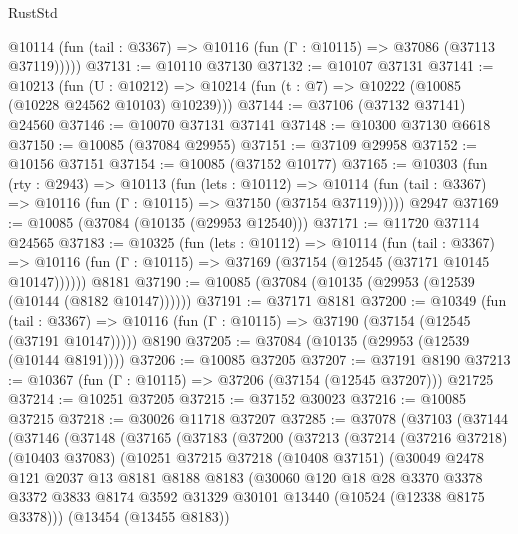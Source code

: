 \begin{lexlean}{RustStd}
\begin{coremodule}
      @10114 (fun (tail : @3367) => @10116 (fun (Γ : @10115) => @37086 (@37113 @37119)))))
@37131 := @10110 @37130
@37132 := @10107 @37131
@37141 := @10213
    (fun (U : @10212) => @10214 (fun (t : @7) => @10222 (@10085 (@10228 @24562 @10103) @10239)))
@37144 := @37106 (@37132 @37141) @24560
@37146 := @10070 @37131 @37141
@37148 := @10300 @37130 @6618
@37150 := @10085 (@37084 @29955)
@37151 := @37109 @29958
@37152 := @10156 @37151
@37154 := @10085 (@37152 @10177)
@37165 := @10303
    (fun (rty : @2943) =>
    @10113
      (fun (lets : @10112) =>
      @10114 (fun (tail : @3367) => @10116 (fun (Γ : @10115) => @37150 (@37154 @37119)))))
    @2947
@37169 := @10085 (@37084 (@10135 (@29953 @12540)))
@37171 := @11720 @37114 @24565
@37183 := @10325
    (fun (lets : @10112) =>
    @10114
      (fun (tail : @3367) =>
      @10116 (fun (Γ : @10115) => @37169 (@37154 (@12545 (@37171 @10145 @10147))))))
    @8181
@37190 := @10085 (@37084 (@10135 (@29953 (@12539 (@10144 (@8182 @10147))))))
@37191 := @37171 @8181
@37200 := @10349
    (fun (tail : @3367) => @10116 (fun (Γ : @10115) => @37190 (@37154 (@12545 (@37191 @10147)))))
    @8190
@37205 := @37084 (@10135 (@29953 (@12539 (@10144 @8191))))
@37206 := @10085 @37205
@37207 := @37191 @8190
@37213 := @10367 (fun (Γ : @10115) => @37206 (@37154 (@12545 @37207))) @21725
@37214 := @10251 @37205
@37215 := @37152 @30023
@37216 := @10085 @37215
@37218 := @30026 @11718 @37207
@37285 := @37078
    (@37103
      (@37144
        (@37146
          (@37148
            (@37165
              (@37183
                (@37200
                  (@37213
                    (@37214
                      (@37216 @37218)
                      (@10403 @37083)
                      (@10251
                        @37215
                        @37218
                        (@10408 @37151)
                        (@30049
                          @2478
                          @121
                          @2037
                          @13
                          @8181
                          @8188
                          @8183
                          (@30060
                            @120
                            @18
                            @28
                            @3370
                            @3378
                            @3372
                            @3833
                            @8174
                            @3592
                            @31329
                            @30101
                            @13440
                            (@10524 (@12338 @8175 @3378)))
                          (@13454 (@13455 @8183))

\end{coremodule}
\end{lexlean}
